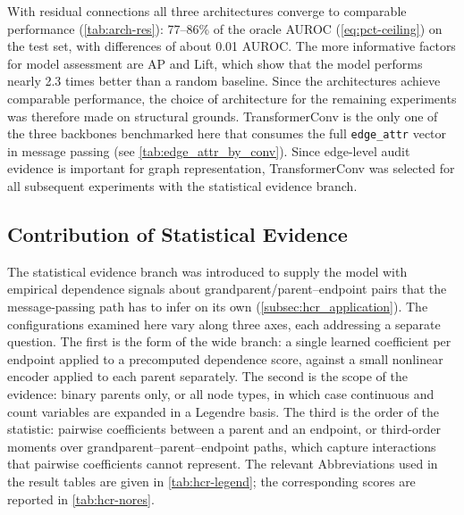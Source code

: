     With residual connections all three architectures converge to comparable
    performance (\cref{tab:arch-res}): 77--86\% of the oracle AUROC
    (\cref{eq:pct-ceiling}) on the test
    set, with differences of about 0.01 AUROC. The more informative factors for model assessment are AP and 
    Lift, which show that the model performs nearly 2.3 times better than a random baseline. 
    Since the architectures achieve comparable performance, the choice of architecture
    for 
    the remaining experiments 
    was therefore made on structural grounds. TransformerConv is the only one of the three
    backbones benchmarked here that consumes the full \texttt{edge\_attr} vector in message
    passing (see \cref{tab:edge_attr_by_conv}).
    Since edge-level audit evidence is important for graph representation, 
    TransformerConv was
    selected for all subsequent experiments with the statistical evidence branch.

\subsection{Contribution of Statistical Evidence}
\label{sec:taskB-hcr-results}

The statistical evidence branch was introduced to supply the model with empirical dependence
signals about grandparent/parent--endpoint pairs that the message-passing path has to infer on
its own (\cref{subsec:hcr_application}). The configurations examined here
vary along three axes, each addressing a separate question. The first is the
form of the wide branch: a single learned coefficient per endpoint applied
to a precomputed dependence score, against a small nonlinear encoder applied
to each parent separately. The second is the scope of the evidence: binary
parents only, or all node types, in which case continuous and count
variables are expanded in a Legendre basis. The third is the order of the
statistic: pairwise coefficients between a parent and an endpoint, or
third-order moments over grandparent--parent--endpoint paths, which capture
interactions that pairwise coefficients cannot represent. The relevant 
Abbreviations used in the result tables are given in \cref{tab:hcr-legend};
the corresponding scores are reported in \cref{tab:hcr-nores}.

